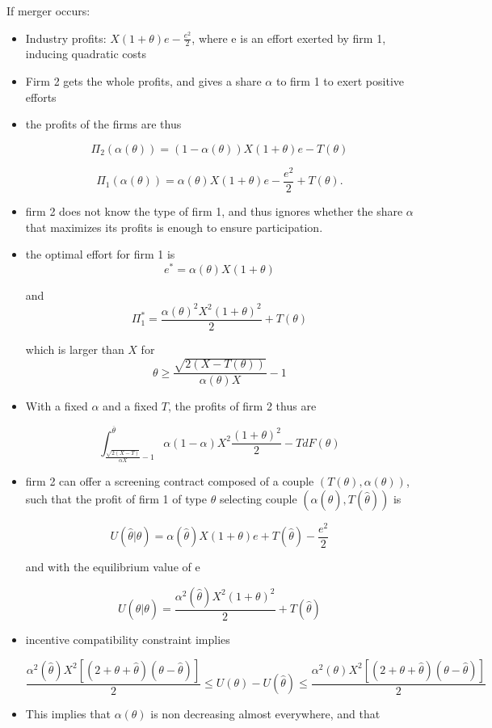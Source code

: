\documentclass[a4paper]{article}
\renewcommand{\th}{\hat\theta}
\renewcommand{\t}{\theta}
\renewcommand{\a}{\alpha}
\begin{document}
If merger occurs:

\begin{itemize}
    \item Industry profits: $X(1+\t)e-\frac{e^2}{2}$, where e is an effort exerted by firm 1, inducing quadratic costs
    \item Firm 2 gets the whole profits, and gives a share $\a$ to firm 1 to exert positive efforts
    \item the profits of the firms are thus
    
    $$\Pi_2(\a(\t))= (1-\a(\t))X(1+\t)e-T(\t)$$

    \[\Pi_1(\a(\t))= \a(\t) X(1+\t)e-\frac{e^2}{2}+T(\t).\]
    
    \item firm 2 does not know the type of firm 1, and thus ignores whether the share $\a$ that maximizes its profits is enough to ensure participation.
    
    \item the optimal effort for firm 1 is $$e^*=\a(\t) X(1+\t)$$ 
    
    and $$\Pi_1^*=\frac{\a(\t)^2 X^2(1+\t)^2}{2}+T(\t)$$
    
    which is larger than $X$ for $$\t\geq \frac{\sqrt{2 (X-T(\t))}}{\a(\t) X}-1$$
    
    \item With a fixed $\a$ and a fixed $T$, the profits of firm 2 thus are
    
    $$\int_{\frac{\sqrt{2 (X-T)}}{\a X}-1}^{\overline \t}\a(1-\a)X^2\frac{(1+\t)^2}{2}-T dF(\t)$$
    
    \item firm 2 can offer a screening contract composed of a couple $(T(\t),\a(\t))$, such that the profit of firm 1 of type $\t$ selecting couple $(\a(\th), T(\th))$ is
    
    $$U(\hat \t|\t)=\a(\hat \t) X(1+\t)e+T(\hat \t)-\frac{e^2}{2}$$
    
    and with the equilibrium value of e
    
    $$U(\hat \t|\t)=\frac{\a^2(\hat \t) X^2(1+\t)^2}{2}+ T(\hat \t)$$
    
    \item incentive compatibility constraint implies  
    
    $$\frac{\a^2(\hat \t) X^2[(2+\t+\hat \t)(\t - \hat \t)]}{2}\leq U(\t)-U(\hat \t)\leq \frac{\a^2(\t) X^2[(2+\t+\hat \t)(\t - \hat \t)]}{2}$$
    \item This implies that $\a(\t)$ is non decreasing almost everywhere, and that 
    

\end{itemize}
\end{document}
